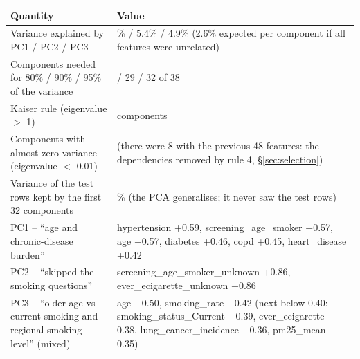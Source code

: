\begin{tabularx}{\textwidth}{>{\raggedright\arraybackslash}p{5.2cm} >{\raggedright\arraybackslash}X}
\toprule
Quantity & Value \\
\midrule
Variance explained by PC1 / PC2 / PC3 & 7.3\% / 5.4\% / 4.9\% (2.6\% expected per component if all features were unrelated) \\
Components needed for 80\% / 90\% / 95\% of the variance & 24 / 29 / 32 of 38 \\
Kaiser rule (eigenvalue $>$ 1) & 19 components \\
Components with almost zero variance (eigenvalue $<$ 0.01) & 0 (there were 8 with the previous 48 features: the dependencies removed by rule 4, \S\ref{sec:selection}) \\
Variance of the test rows kept by the first 32 components & 95.8\% (the PCA generalises; it never saw the test rows) \\
PC1 -- ``age and chronic-disease burden'' & hypertension +0.59, screening\_age\_smoker +0.57, age +0.57, diabetes +0.46, copd +0.45, heart\_disease +0.42 \\
PC2 -- ``skipped the smoking questions'' & screening\_age\_smoker\_unknown +0.86, ever\_ecigarette\_unknown +0.86 \\
PC3 -- ``older age vs current smoking and regional smoking level'' (mixed) & age +0.50, smoking\_rate $-$0.42 (next below 0.40: smoking\_status\_Current $-$0.39, ever\_ecigarette $-$0.38, lung\_cancer\_incidence $-$0.36, pm25\_mean $-$0.35) \\
\bottomrule
\end{tabularx}
